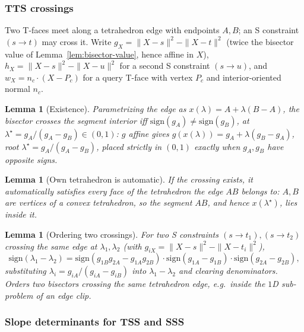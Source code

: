 \documentclass[12pt]{article}
\newtheorem{lemma}[theorem]{Lemma}
\theoremstyle{definition}
\theoremstyle{remark}
\begin{document}
\subsubsection*{TTS crossings}

Two T-faces meet along a tetrahedron edge with endpoints $A,B$; an S
constraint $(s\!\to\!t)$ may cross it. Write $g_X=\|X-s\|^2-\|X-t\|^2$
(twice the bisector value of Lemma~\ref{lem:bisector-value}, hence affine in
$X$), $h_X=\|X-s\|^2-\|X-u\|^2$ for a second S constraint $(s\!\to\!u)$, and
$w_X=n_c\cdot(X-P_c)$ for a query T-face with vertex $P_c$ and
interior-oriented normal $n_c$.

\begin{lemma}[Existence]\label{prop:tts-exist}
Parametrizing the edge as $x(\lambda)=A+\lambda(B-A)$, the bisector crosses
the segment interior iff $\mathrm{sign}(g_A)\neq\mathrm{sign}(g_B)$, at
$\lambda^\star = g_A/(g_A-g_B) \in (0,1)$: $g$ affine gives
$g(x(\lambda))=g_A+\lambda(g_B-g_A)$, root $\lambda^\star=g_A/(g_A-g_B)$,
placed strictly in $(0,1)$ exactly when $g_A,g_B$ have opposite signs.
\end{lemma}

\begin{lemma}[Own tetrahedron is automatic]\label{prop:tts-vsT}
If the crossing exists, it automatically satisfies every face of the
tetrahedron the edge $AB$ belongs to: $A,B$ are vertices of a convex
tetrahedron, so the segment $AB$, and hence $x(\lambda^\star)$, lies inside
it.
\end{lemma}

\begin{lemma}[Ordering two crossings]\label{prop:tts-order}
For two S constraints $(s\!\to\!t_1),(s\!\to\!t_2)$ crossing the same edge
at $\lambda_1,\lambda_2$ (with $g_{iX}=\|X-s\|^2-\|X-t_i\|^2$),
\begin{equation*}
    \mathrm{sign}(\lambda_1-\lambda_2) = \mathrm{sign}(g_{1B}g_{2A}-g_{1A}g_{2B})\cdot\mathrm{sign}(g_{1A}-g_{1B})\cdot\mathrm{sign}(g_{2A}-g_{2B}),
\end{equation*}
substituting $\lambda_i=g_{iA}/(g_{iA}-g_{iB})$ into $\lambda_1-\lambda_2$
and clearing denominators. Orders two bisectors crossing the same
tetrahedron edge, e.g.\ inside the $1$D sub-problem of an edge clip.
\end{lemma}

\subsubsection*{Slope determinants for TSS and SSS}
\end{document}
